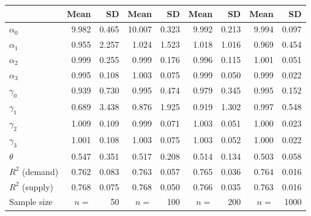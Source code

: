 
\begin{tabular}[t]{lrrrrrrrr}
\toprule
  & Mean & SD & Mean  & SD  & Mean   & SD   & Mean    & SD   \\
\midrule
$\alpha_{0}$ & 9.982 & 0.465 & 10.007 & 0.323 & 9.992 & 0.213 & 9.994 & 0.097\\
$\alpha_{1}$ & 0.955 & 2.257 & 1.024 & 1.523 & 1.018 & 1.016 & 0.969 & 0.454\\
$\alpha_{2}$ & 0.999 & 0.255 & 0.999 & 0.176 & 0.996 & 0.115 & 1.001 & 0.051\\
$\alpha_{3}$ & 0.995 & 0.108 & 1.003 & 0.075 & 0.999 & 0.050 & 0.999 & 0.022\\
$\gamma_{0}$ & 0.939 & 0.730 & 0.995 & 0.474 & 0.979 & 0.345 & 0.995 & 0.152\\
$\gamma_{1}$ & 0.689 & 3.438 & 0.876 & 1.925 & 0.919 & 1.302 & 0.997 & 0.548\\
$\gamma_{2}$ & 1.009 & 0.109 & 0.999 & 0.071 & 1.003 & 0.051 & 1.000 & 0.023\\
$\gamma_{3}$ & 1.001 & 0.108 & 1.003 & 0.075 & 1.003 & 0.052 & 1.000 & 0.022\\
$\theta$ & 0.547 & 0.351 & 0.517 & 0.208 & 0.514 & 0.134 & 0.503 & 0.058\\
$R^{2}$ (demand) & 0.762 & 0.083 & 0.763 & 0.057 & 0.765 & 0.036 & 0.764 & 0.016\\
$R^{2}$ (supply) & 0.768 & 0.075 & 0.768 & 0.050 & 0.766 & 0.035 & 0.763 & 0.016\\
Sample size & $n =$ & 50 & $n =$ & 100 & $n =$ & 200 & $n =$ & 1000\\
\bottomrule
\end{tabular}
